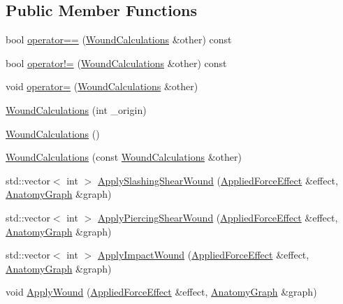\subsection*{Public Member Functions}
\begin{DoxyCompactItemize}
\item 
bool \mbox{\hyperlink{class_wound_calculations_a2ba9ec1747090ae2a03fea1702906504}{operator==}} (\mbox{\hyperlink{class_wound_calculations}{Wound\+Calculations}} \&other) const
\item 
bool \mbox{\hyperlink{class_wound_calculations_ad2b94568adacf5e0d0ede9fa639de88c}{operator!=}} (\mbox{\hyperlink{class_wound_calculations}{Wound\+Calculations}} \&other) const
\item 
void \mbox{\hyperlink{class_wound_calculations_a539972ef16a667af23ccdd51246277f3}{operator=}} (\mbox{\hyperlink{class_wound_calculations}{Wound\+Calculations}} \&other)
\item 
\mbox{\hyperlink{class_wound_calculations_ab315bd7c8a63f7bc479da6300ac822b5}{Wound\+Calculations}} (int \+\_\+origin)
\item 
\mbox{\hyperlink{class_wound_calculations_a135735ed4b97107e6d904538d37428b0}{Wound\+Calculations}} ()
\item 
\mbox{\hyperlink{class_wound_calculations_acd469ea09e0959d8d79eece4b9e37cff}{Wound\+Calculations}} (const \mbox{\hyperlink{class_wound_calculations}{Wound\+Calculations}} \&other)
\item 
std\+::vector$<$ int $>$ \mbox{\hyperlink{class_wound_calculations_ae0e649e97591c6a6b28d6a4ff7e0324e}{Apply\+Slashing\+Shear\+Wound}} (\mbox{\hyperlink{struct_applied_force_effect}{Applied\+Force\+Effect}} \&effect, \mbox{\hyperlink{_body_graph_8hpp_ab01b157c2e143191570b012d275fbf0d}{Anatomy\+Graph}} \&graph)
\item 
std\+::vector$<$ int $>$ \mbox{\hyperlink{class_wound_calculations_ac763bba5d770b968ab68532b974d878d}{Apply\+Piercing\+Shear\+Wound}} (\mbox{\hyperlink{struct_applied_force_effect}{Applied\+Force\+Effect}} \&effect, \mbox{\hyperlink{_body_graph_8hpp_ab01b157c2e143191570b012d275fbf0d}{Anatomy\+Graph}} \&graph)
\item 
std\+::vector$<$ int $>$ \mbox{\hyperlink{class_wound_calculations_a645dc9bb6dfc7d5fc20fc8e8b91fd430}{Apply\+Impact\+Wound}} (\mbox{\hyperlink{struct_applied_force_effect}{Applied\+Force\+Effect}} \&effect, \mbox{\hyperlink{_body_graph_8hpp_ab01b157c2e143191570b012d275fbf0d}{Anatomy\+Graph}} \&graph)
\item 
void \mbox{\hyperlink{class_wound_calculations_a8143ba01702cf1a1072d17ee7deab4e0}{Apply\+Wound}} (\mbox{\hyperlink{struct_applied_force_effect}{Applied\+Force\+Effect}} \&effect, \mbox{\hyperlink{_body_graph_8hpp_ab01b157c2e143191570b012d275fbf0d}{Anatomy\+Graph}} \&graph)
\end{DoxyCompactItemize}
